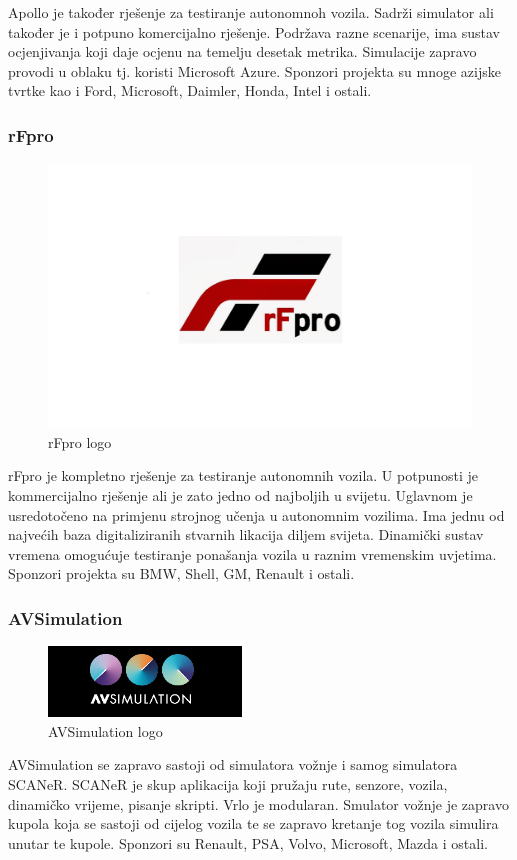Apollo je također rješenje za testiranje autonomnoh vozila. Sadrži simulator ali također je i potpuno komercijalno rješenje. Podržava razne scenarije, ima sustav ocjenjivanja koji daje ocjenu na temelju desetak metrika. Simulacije zapravo provodi u oblaku tj. koristi Microsoft Azure. Sponzori projekta su mnoge azijske tvrtke kao i Ford, Microsoft, Daimler, Honda, Intel i ostali.

\subsubsection{rFpro}
\begin{figure}[ht!]
  \centering
  \includegraphics[scale=0.2]{images/rfpro_logo.jpg}
  \caption{rFpro logo}
\end{figure}

rFpro je kompletno rješenje za testiranje autonomnih vozila. U potpunosti je kommercijalno rješenje ali je zato jedno od najboljih u svijetu. Uglavnom je usredotočeno na primjenu strojnog učenja u autonomnim vozilima. Ima jednu od najvećih baza digitaliziranih stvarnih likacija diljem svijeta. Dinamički sustav vremena omogućuje testiranje ponašanja vozila u raznim vremenskim uvjetima. Sponzori projekta su BMW, Shell, GM, Renault i ostali.

\subsubsection{AVSimulation}
\begin{figure}[ht!]
  \centering
  \includegraphics{images/avsimulation_logo.png}
  \caption{AVSimulation logo}
\end{figure}

AVSimulation se zapravo sastoji od simulatora vožnje i samog simulatora SCANeR. SCANeR je skup aplikacija koji pružaju rute, senzore, vozila, dinamičko vrijeme, pisanje skripti. Vrlo je modularan. Smulator vožnje je zapravo kupola koja se sastoji od cijelog vozila te se zapravo kretanje tog vozila simulira unutar te kupole. Sponzori su Renault, PSA, Volvo, Microsoft, Mazda i ostali.
\newpage